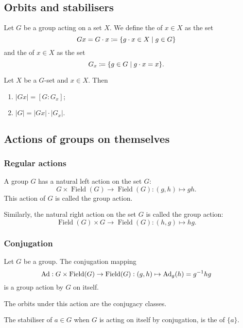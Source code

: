 \subsection{Orbits and stabilisers}
\begin{definition}
Let $G$ be a group acting on a set $X$. We define the  of $x\in X$ as the set
\[ Gx = G\cdot x \defeq \setbuilder{g\cdot x \in X}{g\in G}  \]
and the  of $x\in X$ as the set
\[ G_x \defeq \setbuilder{g\in G}{g\cdot x = x}. \]
\end{definition}
\begin{proposition}
Let $X$ be a $G$-set and $x\in X$. Then
\begin{enumerate}
\item $|Gx| = [G:G_x]$;
\item $|G| = |Gx|\cdot |G_x|$.
\end{enumerate}
\end{proposition}

\subsection{Actions of groups on themselves}
\subsubsection{Regular actions}
\begin{definition}
A group $G$ has a natural left action on the set $G$:
\[ G\times \operatorname{Field}(G) \to \operatorname{Field}(G): (g,h) \mapsto gh. \]
This action of $G$ is called the  group action.

Similarly, the natural right action on the set $G$ is called the  group action:
\[ \operatorname{Field}(G) \times G \to \operatorname{Field}(G): (h,g) \mapsto hg. \]
\end{definition}

\subsubsection{Conjugation}
Let $G$ be a group. The conjugation mapping
\[ \operatorname{Ad}: G\times \operatorname{Field}(G) \to \operatorname{Field}(G): (g,h) \mapsto \operatorname{Ad}_g(h) = g^{-1}hg \]
is a group action by $G$ on itself.

The orbits under this action are the conjugacy classes.

The stabiliser of $a\in G$ when $G$ is acting on itself by conjugation, is the  of $\{a\}$.





